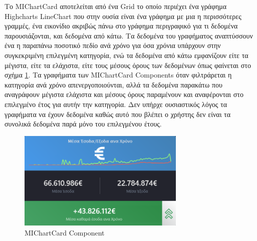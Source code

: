 Το MIChartCard αποτελείται από ένα Grid το οποίο περιέχει ένα γράφημα Highcharts LineChart που στην ουσία είναι ένα γράφημα με μια η περισσότερες γραμμές, ένα εικονίδιο ακριβώς πάνω στο γράφημα περιγραφικό για τι δεδομένα παρουσιάζονται, και δεδομένα από κάτω. Τα δεδομένα του γραφήματος αναπτύσσουν ένα η παραπάνω ποσοτικό πεδίο ανά χρόνο για όσα χρόνια υπάρχουν στην συγκεκριμένη επιλεγμένη κατηγορία, ενώ τα δεδομένα από κάτω εμφανίζουν είτε τα μέγιστα, είτε τα ελάχιστα, είτε τους μέσους όρους των δεδομένων όπως φαίνεται στο σχήμα \ref{layout:michartcard}. Τα γραφήματα των MIChartCard Components όταν φιλτράρεται η κατηγορία ανά χρόνο απενεργοποιούνται, αλλά τα δεδομένα παρακάτω που αναγράφουν μέγιστα ελάχιστα και μέσους όρους παραμένουν και αναφέρονται στο επιλεγμένο έτος για αυτήν την κατηγορία. Δεν υπήρχε ουσιαστικός λόγος τα γραφήματα να έχουν δεδομένα καθώς αυτό που βλέπει ο χρήστης δεν είναι τα συνολικά δεδομένα παρά μόνο του επιλεγμένου έτους.

\begin{figure}[h]
  \centering
  \includegraphics[width=80mm]{Chapters/5 - Architecture/Client/Images/michardcard.png}
  \caption{MIChartCard Component}
  \label{layout:michartcard}
\end{figure}